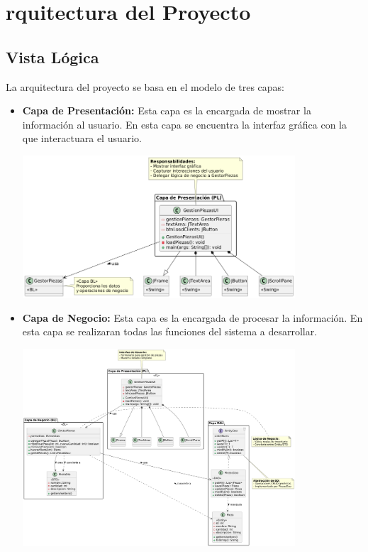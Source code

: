 \section*{\centering rquitectura del Proyecto}

\subsection*{\centering Vista Lógica}
La arquitectura del proyecto se basa en el modelo de tres capas: 
\begin{itemize}
    \item \textbf{Capa de Presentación:} Esta capa es la encargada de mostrar la información al usuario. 
    En esta capa se encuentra la interfaz gráfica con la que interactuara el usuario.
    \newline
    \begin{center} 
        \includegraphics[width=0.8\textwidth]{imag/ImagenDiagramaUmlCapaPresentacion.png}
    \newline
    \end{center}
     \item \textbf{Capa de Negocio:} Esta capa es la encargada de procesar la información. 
    En esta capa se realizaran todas las funciones del sistema a desarrollar.
    \newline
     \begin{center}
        \includegraphics[width=0.8\textwidth]{imag/ImagenDiagramaUmlBussinesLayer.png}

\end{center}
\end{itemize}
